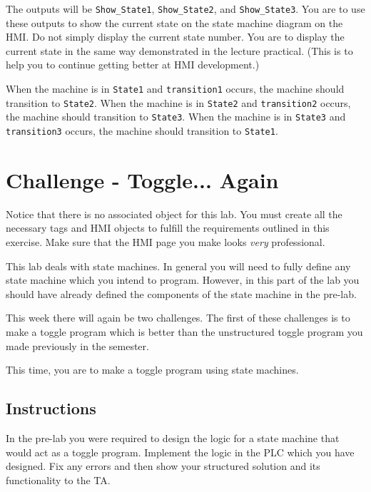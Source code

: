 The outputs will be \verb|Show_State1|, \verb|Show_State2|, and \verb|Show_State3|. You are to use these outputs to show the current state on the state machine diagram on the HMI. Do not simply display the current state number. You are to display the current state in the same way demonstrated in the lecture practical. (This is to help you to continue getting better at HMI development.)

When the machine is in \verb|State1| and \verb|transition1| occurs, the machine should transition to \verb|State2|. When the machine is in \verb|State2| and \verb|transition2| occurs, the machine should transition to \verb|State3|. When the machine is in \verb|State3| and \verb|transition3| occurs, the machine should transition to \verb|State1|. 



\TASignatureSlot



\section{Challenge - Toggle... Again}
Notice that there is no associated object for this lab. You must create all the necessary tags and HMI objects to fulfill the requirements outlined in this exercise. Make sure that the HMI page you make looks \textit{very} professional. 

This lab deals with state machines. In general you will need to fully define any state machine which you intend to program. However, in this part of the lab you should have already defined the components of the state machine in the pre-lab.


This week there will again be two challenges. The first of these challenges is to make a toggle program which is better than the unstructured toggle program you made previously in the semester.

This time, you are to make a toggle program using state machines. 

\subsection{Instructions}

In the pre-lab you were required to design the logic for a state machine that would act as a toggle program. Implement the logic in the PLC which you have designed. Fix any errors and then show your structured solution and its functionality to the TA.

